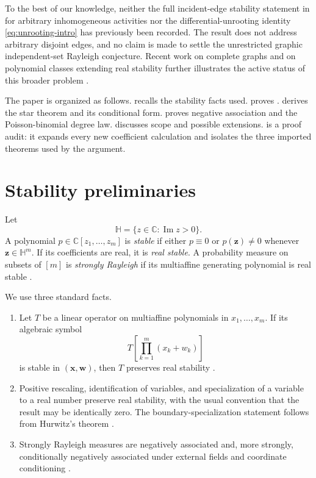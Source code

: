 \documentclass[11pt]{article}
\numberwithin{equation}{section}
\newcommand{\Hh}{\mathbb H}
\newcommand{\xx}{\bm x}
\newcommand{\zz}{\bm z}
\begin{document}
To the best of our knowledge, neither the full incident-edge stability statement in  for arbitrary inhomogeneous activities nor the differential-unrooting identity \eqref{eq:unrooting-intro} has previously been recorded.  The result does not address arbitrary disjoint edges, and no claim is made to settle the unrestricted graphic independent-set Rayleigh conjecture.  Recent work on complete graphs and on polynomial classes extending real stability further illustrates the active status of this broader problem \cite{TangZhang2026,FangMa2026}.

The paper is organized as follows.   recalls the stability facts used.   proves .   derives the star theorem and its conditional form.   proves negative association and the Poisson-binomial degree law.   discusses scope and possible extensions.   is a proof audit: it expands every new coefficient calculation and isolates the three imported theorems used by the argument.

\section{Stability preliminaries}\label{sec:stability}

Let
\[
 \Hh=\{z\in\mathbb C:\operatorname{Im}z>0\}.
\]
A polynomial $p\in\mathbb C[z_1,\dots,z_m]$ is \emph{stable} if either $p\equiv0$ or $p(\zz)\neq0$ whenever $\zz\in\Hh^m$.  If its coefficients are real, it is \emph{real stable}.  A probability measure on subsets of $[m]$ is \emph{strongly Rayleigh} if its multiaffine generating polynomial is real stable \cite{BorceaBrandenLiggett2009}.

We use three standard facts.

\begin{enumerate}[label=(S\arabic*)]
\item\label{item:symbol} Let $T$ be a linear operator on multiaffine polynomials in $x_1,\dots,x_m$.  If its algebraic symbol
\begin{equation}\label{eq:symbol-criterion}
 T\!\left[\prod_{k=1}^m(x_k+w_k)\right]
\end{equation}
is stable in $(\xx,\bm w)$, then $T$ preserves real stability \cite{BorceaBranden2009}.

\item\label{item:specialization} Positive rescaling, identification of variables, and specialization of a variable to a real number preserve real stability, with the usual convention that the result may be identically zero.  The boundary-specialization statement follows from Hurwitz's theorem \cite{BorceaBranden2009}.

\item\label{item:NA} Strongly Rayleigh measures are negatively associated and, more strongly, conditionally negatively associated under external fields and coordinate conditioning \cite{BorceaBrandenLiggett2009}.
\end{enumerate}
\end{document}
